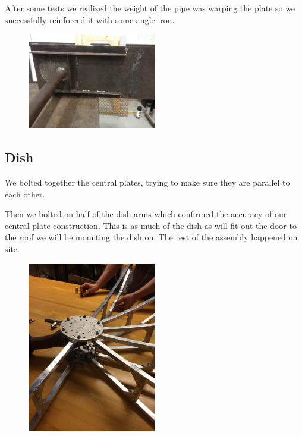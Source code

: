 \documentclass[11pt]{article} %
\begin{document}
After some tests we realized the weight of the pipe was warping the plate so we successfully reinforced it with some angle iron.

\begin{figure}
  \centering
  \caption{   }
  \includegraphics[width=0.50\textwidth]{roofmount/06.jpeg}
\end{figure}

\subsection{Dish}

We bolted together the central plates, trying to make sure they are parallel to each other.

Then we bolted on half of the dish arms which confirmed the accuracy of our central plate construction. This is as much of the dish as will fit out the door to the roof we will be mounting the dish on. The rest of the assembly happened on site.



\begin{figure}
  \centering
  \caption{   }
  \includegraphics[width=0.50\textwidth]{dish/01.jpeg}
\end{figure}
\end{document}
